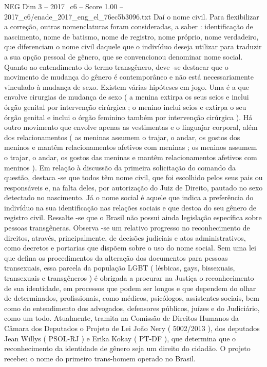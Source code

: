 \begin{textsample}{NEG Dim 3 – 2017\_c6 – Score 1.00 – 2017\_c6/enade\_2017\_eng\_el\_76ec5b3096.txt}
Daí o nome civil.
Para flexibilizar a correção, outras nomenclaturas foram consideradas, a saber : identificação de nascimento, nome de batismo, nome de registro, nome próprio, nome verdadeiro, que diferenciam o nome civil daquele que o indivíduo deseja utilizar para traduzir a sua opção pessoal de gênero, que se convencionou denominar nome social.
Quanto ao entendimento do termo transgênero, deve -se destacar que o movimento de mudança do gênero é contemporâneo e não está necessariamente vinculado à mudança de sexo.
Existem várias hipóteses em jogo.
Uma é a que envolve cirurgias de mudança de sexo ( a menina extirpa os seus seios e inclui órgão genital por intervenção cirúrgica ; o menino inclui seios e extirpa o seu órgão genital e inclui o órgão feminino também por intervenção cirúrgica ).
Há outro movimento que envolve apenas as vestimentas e o linguajar corporal, além dos relacionamentos ( as meninas assumem o trajar, o andar, os gostos dos meninos e mantêm relacionamentos afetivos com meninas ; os meninos assumem o trajar, o andar, os gostos das meninas e mantêm relacionamentos afetivos com meninos ).
Em relação à discussão da primeira solicitação do comando da questão, destaca -se que todos têm nome civil, que foi escolhido pelos seus pais ou responsáveis e, na falta deles, por autorização do Juiz de Direito, pautado no sexo detectado no nascimento.
Já o nome social é aquele que indica a preferência do indivíduo na sua identificação nas relações sociais e que destoa do seu gênero de registro civil.
Ressalte -se que o Brasil não possui ainda legislação específica sobre pessoas transgêneras.
Observa -se um relativo progresso no reconhecimento de direitos, através, principalmente, de decisões judiciais e atos administrativos, como decretos e portarias que dispõem sobre o uso do nome social.
Sem uma lei que defina os procedimentos da alteração dos documentos para pessoas transexuais, essa parcela da população LGBT ( lésbicas, gays, bissexuais, transexuais e transgêneros ) é obrigada a procurar na Justiça o reconhecimento de sua identidade, em processos que podem ser longos e que dependem do olhar de determinados, profissionais, como médicos, psicólogos, assistentes sociais, bem como do entendimento dos advogados, defensores públicos, juízes e do Judiciário, como um todo.
Atualmente, tramita na Comissão de Direitos Humanos da Câmara dos Deputados o Projeto de Lei João Nery ( 5002/2013 ), dos deputados Jean Willys ( PSOL-RJ ) e Erika Kokay ( PT-DF ), que determina que o reconhecimento da identidade de gênero seja um direito do cidadão.
O projeto recebeu o nome do primeiro trans-homem operado no Brasil.

\end{textsample}
